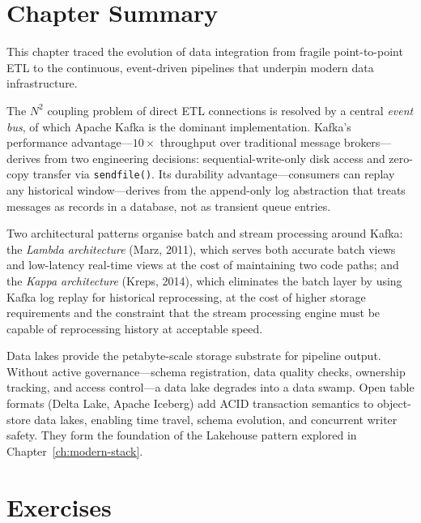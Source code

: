 \section*{Chapter Summary}
\label{sec:ch8-summary}

This chapter traced the evolution of data integration from fragile
point-to-point ETL to the continuous, event-driven pipelines that
underpin modern data infrastructure.

The $N^2$ coupling problem of direct ETL connections is resolved by a
central \emph{event bus}, of which Apache Kafka is the dominant
implementation. Kafka's performance advantage---$10\times$ throughput over
traditional message brokers---derives from two engineering decisions:
sequential-write-only disk access and zero-copy transfer via \texttt{sendfile()}.
Its durability advantage---consumers can replay any historical window---derives
from the append-only log abstraction that treats messages as records in a
database, not as transient queue entries.

Two architectural patterns organise batch and stream processing around
Kafka: the \emph{Lambda architecture} (Marz, 2011), which serves both
accurate batch views and low-latency real-time views at the cost of
maintaining two code paths; and the \emph{Kappa architecture} (Kreps, 2014),
which eliminates the batch layer by using Kafka log replay for historical
reprocessing, at the cost of higher storage requirements and the constraint
that the stream processing engine must be capable of reprocessing history
at acceptable speed.

Data lakes provide the petabyte-scale storage substrate for pipeline output.
Without active governance---schema registration, data quality checks,
ownership tracking, and access control---a data lake degrades into a
data swamp. Open table formats (Delta Lake, Apache Iceberg) add ACID
transaction semantics to object-store data lakes, enabling time travel,
schema evolution, and concurrent writer safety. They form the foundation
of the Lakehouse pattern explored in Chapter~\ref{ch:modern-stack}.

\section*{Exercises}
\label{sec:ch8-exercises}

